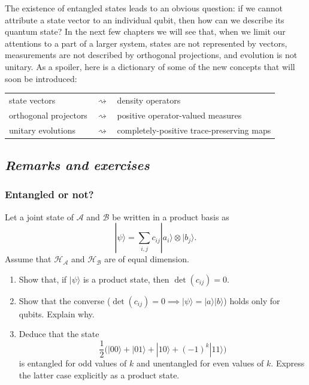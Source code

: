 \documentclass[fleqn,a4paper]{article}
\theoremstyle{definition}
\theoremstyle{definition}
\theoremstyle{definition}
\theoremstyle{definition}
\theoremstyle{remark}
\begin{document}
The existence of entangled states leads to an obvious question: if we cannot attribute a state vector to an individual qubit, then how can we describe its quantum state?
In the next few chapters we will see that, when we limit our attentions to a part of a larger system, states are not represented by vectors, measurements are not described by orthogonal projections, and evolution is not unitary.
As a spoiler, here is a dictionary of some of the new concepts that will soon be introduced:

\begin{longtable}[]{@{}
  >{\raggedleft\arraybackslash}p{}
  >{\centering\arraybackslash}p{}
  >{\raggedright\arraybackslash}p{}@{}}
\toprule()
\endhead
state vectors & \(\rightsquigarrow\) & density operators \\
orthogonal projectors & \(\rightsquigarrow\) & positive operator-valued measures \\
unitary evolutions & \(\rightsquigarrow\) & completely-positive trace-preserving maps \\
\bottomrule()
\end{longtable}

\hypertarget{remarks-and-exercises-entanglement}{%
\subsection{\texorpdfstring{\emph{Remarks and exercises}}{Remarks and exercises}}\label{remarks-and-exercises-entanglement}}

\hypertarget{entangled-or-not}{%
\subsubsection{Entangled or not?}\label{entangled-or-not}}

Let a joint state of \(\mathcal{A}\) and \(\mathcal{B}\) be written in a product basis as
\[
  |\psi\rangle = \sum_{i,j} c_{ij}|a_i\rangle\otimes|b_j\rangle.
\]
Assume that \(\mathcal{H}_{\mathcal{A}}\) and \(\mathcal{H}_{\mathcal{B}}\) are of equal dimension.

\begin{enumerate}
\def\labelenumi{\arabic{enumi}.}
\item
  Show that, if \(|\psi\rangle\) is a product state, then \(\det (c_{ij}) = 0\).
\item
  Show that the converse (\(\det(c_{ij})=0\implies|\psi\rangle=|a\rangle|b\rangle\)) holds only for qubits. Explain why.
\item
  Deduce that the state
  \[
   \frac{1}{2}\big(|00\rangle + |01\rangle + |10\rangle + (-1)^k|11\rangle\big)
    \]
  is entangled for odd values of \(k\) and unentangled for even values of \(k\). Express the latter case explicitly as a product state.
\end{enumerate}
\end{document}
